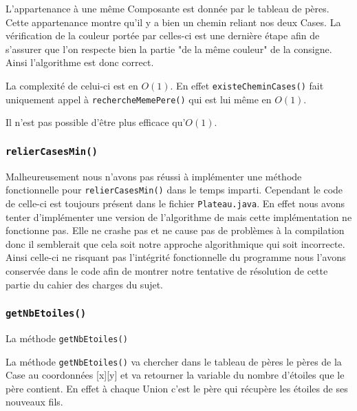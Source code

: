 \documentclass{article}
\newcommand{\info}{\texttt}
\begin{document}
                L'appartenance à une même Composante est donnée par le tableau de pères. Cette appartenance montre qu'il y a bien un chemin reliant nos deux Cases. La vérification de la couleur portée par celles-ci est une dernière étape afin de s'assurer que l'on respecte bien la partie "de la même couleur" de la consigne. Ainsi l'algorithme est donc correct.
                
                La complexité de celui-ci est en $O(1)$. En effet \info{existeCheminCases()} fait uniquement appel à \info{rechercheMemePere()} qui est lui même en $O(1)$.
                
                Il n'est pas possible d'être plus efficace qu'$O(1)$.
                
            \subsubsection{\info{relierCasesMin()}}
            
                Malheureusement nous n'avons pas réussi à implémenter une méthode fonctionnelle pour \info{relierCasesMin()} dans le temps imparti. Cependant le code de celle-ci est toujours présent dans le fichier \info{Plateau.java}. En effet nous avons tenter d'implémenter une version de l'algorithme de  mais cette implémentation ne fonctionne pas. Elle ne crashe pas et ne cause pas de problèmes à la compilation donc il semblerait que cela soit notre approche algorithmique qui soit incorrecte. Ainsi celle-ci ne risquant pas l'intégrité fonctionnelle du programme nous l'avons conservée dans le code afin de montrer notre tentative de résolution de cette partie du cahier des charges du sujet.
                
            \subsubsection{\info{getNbEtoiles()}}
                
                \begin{algorithm}[H]
                \caption{La méthode \info{getNbEtoiles()}}
                \end{algorithm}
                
                La méthode \info{getNbEtoiles()} va chercher dans le tableau de pères le pères de la Case au coordonnées [x][y] et va retourner la variable du nombre d'étoiles que le père contient. En effet à chaque Union c'est le père qui récupère les étoiles de ses nouveaux fils.
                
\end{document}
